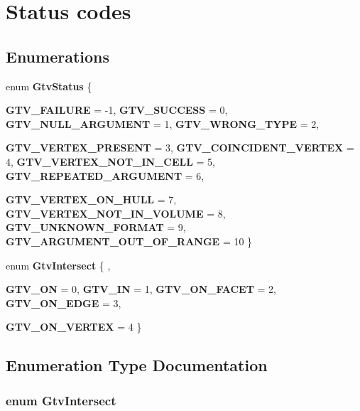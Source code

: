 \section{Status codes}
\label{group__status}
\subsection*{Enumerations}
\begin{CompactItemize}
\item 
enum {\bf GtvStatus} \{ \par
{\bf GTV\_\-FAILURE} =  -1, 
{\bf GTV\_\-SUCCESS} =  0, 
{\bf GTV\_\-NULL\_\-ARGUMENT} =  1, 
{\bf GTV\_\-WRONG\_\-TYPE} =  2, 
\par
{\bf GTV\_\-VERTEX\_\-PRESENT} =  3, 
{\bf GTV\_\-COINCIDENT\_\-VERTEX} =  4, 
{\bf GTV\_\-VERTEX\_\-NOT\_\-IN\_\-CELL} =  5, 
{\bf GTV\_\-REPEATED\_\-ARGUMENT} =  6, 
\par
{\bf GTV\_\-VERTEX\_\-ON\_\-HULL} =  7, 
{\bf GTV\_\-VERTEX\_\-NOT\_\-IN\_\-VOLUME} =  8, 
{\bf GTV\_\-UNKNOWN\_\-FORMAT} =  9, 
{\bf GTV\_\-ARGUMENT\_\-OUT\_\-OF\_\-RANGE} =  10
 \}
\item 
enum {\bf GtvIntersect} \{ , \par
{\bf GTV\_\-ON} =  0, 
{\bf GTV\_\-IN} =  1, 
{\bf GTV\_\-ON\_\-FACET} =  2, 
{\bf GTV\_\-ON\_\-EDGE} =  3, 
\par
{\bf GTV\_\-ON\_\-VERTEX} =  4
 \}
\end{CompactItemize}


\subsection{Enumeration Type Documentation}
\subsubsection{\setlength{\rightskip}{0pt plus 5cm}enum {\bf GtvIntersect}}\label{group__status_gb1a7c0fd996feb29fd2412deb08ff573}


